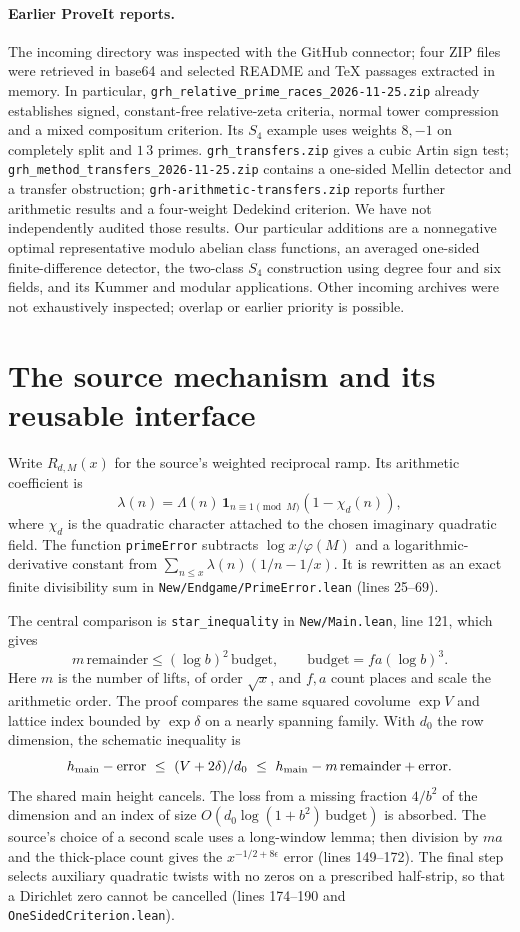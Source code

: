 \documentclass[11pt]{article}
\theoremstyle{definition}\newtheorem{definition}[theorem]{Definition}
\begin{document}
\paragraph{Earlier ProveIt reports.} The incoming directory \cite{prior} was inspected with the GitHub connector; four ZIP files were retrieved in base64 and selected README and TeX passages extracted in memory. In particular, \nolinkurl{grh_relative_prime_races_2026-11-25.zip} already establishes signed, constant-free relative-zeta criteria, normal tower compression and a mixed compositum criterion. Its $S_4$ example uses weights $8,-1$ on completely split and $1\,3$ primes. \nolinkurl{grh_transfers.zip} gives a cubic Artin sign test; \nolinkurl{grh_method_transfers_2026-11-25.zip} contains a one-sided Mellin detector and a transfer obstruction; \nolinkurl{grh-arithmetic-transfers.zip} reports further arithmetic results and a four-weight Dedekind criterion. We have not independently audited those results. Our particular additions are a nonnegative optimal representative modulo abelian class functions, an averaged one-sided finite-difference detector, the two-class $S_4$ construction using degree four and six fields, and its Kummer and modular applications. Other incoming archives were not exhaustively inspected; overlap or earlier priority is possible.

\section{The source mechanism and its reusable interface}
Write $R_{d,M}(x)$ for the source's weighted reciprocal ramp. Its arithmetic coefficient is
\[
 \lambda(n)=\Lambda(n)\,\mathbf 1_{n\equiv1\pmod M}(1-\chi_d(n)),
\]
where $\chi_d$ is the quadratic character attached to the chosen imaginary quadratic field. The function \texttt{primeError} subtracts $\log x/\varphi(M)$ and a logarithmic-derivative constant from $\sum_{n\le x}\lambda(n)(1/n-1/x)$. It is rewritten as an exact finite divisibility sum in \texttt{New/Endgame/PrimeError.lean} (lines 25--69).

The central comparison is \texttt{star\_inequality} in \texttt{New/Main.lean}, line 121, which gives
\[
 m\,\mathrm{remainder}\le (\log b)^2\,\mathrm{budget},\qquad
 \mathrm{budget}=fa(\log b)^3.
\]
Here $m$ is the number of lifts, of order $\sqrt x$, and $f,a$ count places and scale the arithmetic order. The proof compares the same squared covolume $\exp V$ and lattice index bounded by $\exp\delta$ on a nearly spanning family. With $d_0$ the row dimension, the schematic inequality is
\[
 h_{\rm main}-\text{error}\ \le\ (V+2\delta)/d_0\ \le\ h_{\rm main}-m\,\mathrm{remainder}+\text{error}.
\]
The shared main height cancels. The loss from a missing fraction $4/b^2$ of the dimension and an index of size $O(d_0\log(1+b^2)\,\mathrm{budget})$ is absorbed. The source's choice of a second scale uses a long-window lemma; then division by $ma$ and the thick-place count gives the $x^{-1/2+8\epsilon}$ error (lines 149--172). The final step selects auxiliary quadratic twists with no zeros on a prescribed half-strip, so that a Dirichlet zero cannot be cancelled (lines 174--190 and \texttt{OneSidedCriterion.lean}).
\end{document}

